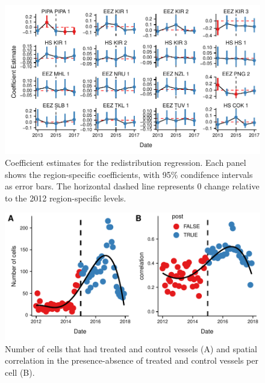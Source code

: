 \documentclass[9pt,twoside,lineno]{pnas-new}
\begin{document}
\begin{figure}
\centering
\includegraphics{img/mean_change.pdf}
\caption{\label{fig:mean_change}Coefficient
estimates for the redistribution regression. Each panel shows the
region-specific coefficients, with 95\% condifence intervals
as error bars. The horizontal dashed line represents 0 change
relative to the 2012 region-specific levels.}
\end{figure}

\clearpage
\begin{landscape}



\end{landscape}
\clearpage

\begin{figure}
\centering
\includegraphics{img/sp_corr.pdf}
\caption{\label{fig:sp_corr}Number of cells that
had treated and control vessels (A) and spatial correlation in the
presence-absence of treated and control vessels per cell (B).}
\end{figure}


\end{document}
